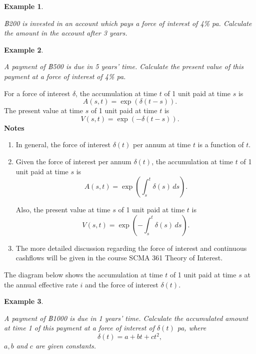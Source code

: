 \documentclass[landscape, 20pt]{extreport}
\theoremstyle{definition}
\theoremstyle{definition}
\newtheorem{example}{Example}[chapter]
\theoremstyle{definition}
\theoremstyle{definition}
\theoremstyle{remark}
\begin{document}
\newpage \begin{example}
\protect\hypertarget{exm:unlabeled-div-59}{}\label{exm:unlabeled-div-59}

\emph{฿200 is invested in an account which pays a force of
interest of 4\% pa. Calculate the amount in the account after 3 years.}

\end{example}

\newpage \begin{example}
\protect\hypertarget{exm:unlabeled-div-60}{}\label{exm:unlabeled-div-60}

\emph{A payment of ฿500 is due in 5 years' time. Calculate
the present value of this payment at a force of interest of 4\% pa.}

\end{example}

For a force of interest \(\delta\), the accumulation at time \(t\) of 1 unit
paid at time \(s\) is \[A(s,t) = \exp( \delta (t-s)).\] The present value
at time \(s\) of 1 unit paid at time \(t\) is
\[V(s,t) = \exp( -\delta (t-s)).\] \textbf{Notes}

\begin{enumerate}
\def\labelenumi{\arabic{enumi}.}
\item
  In general, the force of interest \(\delta(t)\) per annum at time \(t\)
  is a function of \(t\).
\item
  Given the force of interest per annum \(\delta(t)\), the accumulation
  at time \(t\) of 1 unit paid at time \(s\) is
  \[A(s,t) = \exp\left( \int_{s}^t \delta(s) \, ds  \right).\]

  Also, the present value at time \(s\) of 1 unit paid at time \(t\) is
  \[V(s,t) = \exp\left(- \int_{s}^t \delta(s) \, ds  \right).\]
\item
  The more detailed discussion regarding the force of interest and
  continuous cashflows will be given in the course SCMA 361 Theory of
  Interest.
\end{enumerate}

The diagram below shows the accumulation at time \(t\) of 1 unit paid at
time \(s\) at the annual effective rate \(i\) and the force of interest
\(\delta(t)\).

\newpage \begin{example}
\protect\hypertarget{exm:unlabeled-div-61}{}\label{exm:unlabeled-div-61}

\emph{A payment of ฿1000 is due in 1 years' time. Calculate
the accumulated amount at time 1 of this payment at a force of interest
of \(\delta(t)\) pa, where \[\delta(t) = a + b t + c t^2,\] \(a,b\) and \(c\)
are given constants.}

\end{example}
\end{document}
